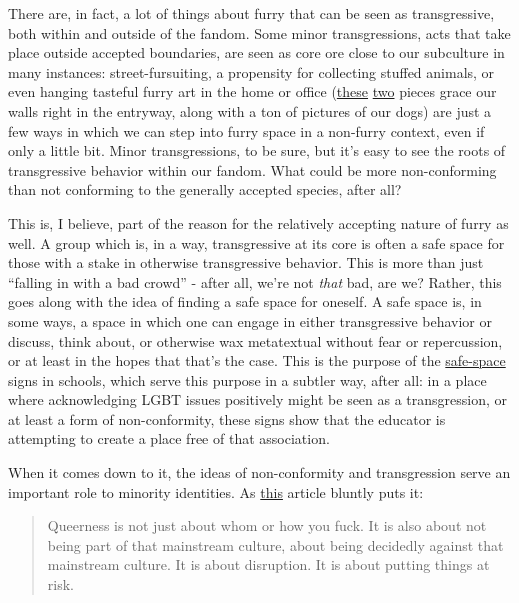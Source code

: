 There are, in fact, a lot of things about furry that can be seen as
transgressive, both within and outside of the fandom. Some minor
transgressions, acts that take place outside accepted boundaries, are
seen as core ore close to our subculture in many instances:
street-fursuiting, a propensity for collecting stuffed animals, or even
hanging tasteful furry art in the home or office
(\href{http://characters.openfurry.org/image/43}{these}
\href{http://characters.openfurry.org/image/92}{two} pieces grace our
walls right in the entryway, along with a ton of pictures of our dogs)
are just a few ways in which we can step into furry space in a non-furry
context, even if only a little bit. Minor transgressions, to be sure,
but it's easy to see the roots of transgressive behavior within our
fandom. What could be more non-conforming than not conforming to the
generally accepted species, after all?

This is, I believe, part of the reason for the relatively accepting
nature of furry as well. A group which is, in a way, transgressive at
its core is often a safe space for those with a stake in otherwise
transgressive behavior. This is more than just ``falling in with a bad
crowd'' - after all, we're not \emph{that} bad, are we? Rather, this
goes along with the idea of finding a safe space for oneself. A safe
space is, in some ways, a space in which one can engage in either
transgressive behavior or discuss, think about, or otherwise wax
metatextual without fear or repercussion, or at least in the hopes that
that's the case. This is the purpose of the
\href{http://en.wikipedia.org/wiki/Safe-space}{safe-space} signs in
schools, which serve this purpose in a subtler way, after all: in a
place where acknowledging LGBT issues positively might be seen as a
transgression, or at least a form of non-conformity, these signs show
that the educator is attempting to create a place free of that
association.

When it comes down to it, the ideas of non-conformity and transgression
serve an important role to minority identities. As
\href{http://theorts.tumblr.com/post/53262160482/invisibility-illegibility-thoughts-on-why}{this}
article bluntly puts it:

\begin{quote}
Queerness is not just about whom or how you fuck. It is also about not
being part of that mainstream culture, about being decidedly against
that mainstream culture. It is about disruption. It is about putting
things at risk.
\end{quote}

